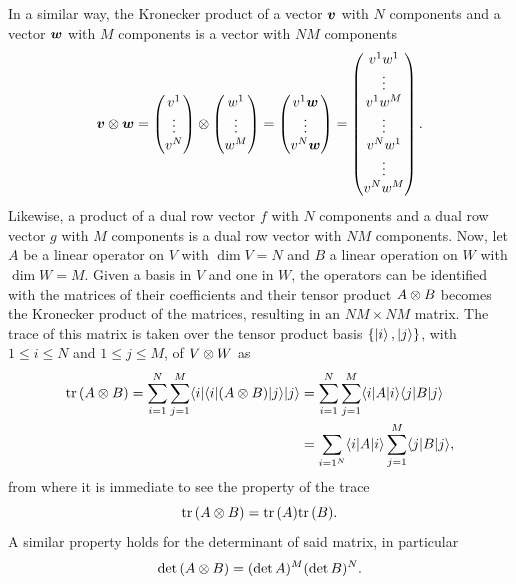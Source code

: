 In a similar way, the Kronecker product of a vector $\bm{v}$ with $N$ components and a vector $\bm{w}$ with $M$ components is a vector with $NM$ components
\begin{equation}
    \bm{v} \otimes \bm{w} = 
    \begin{pmatrix}
        v^1 \\
        \vdots \\
        v^N
    \end{pmatrix} \otimes 
    \begin{pmatrix}
        w^1 \\
        \vdots \\
        w^M
    \end{pmatrix} =
    \begin{pmatrix}
        v^1\bm{w} \\
        \vdots \\
        v^N\bm{w}
    \end{pmatrix} = 
    \begin{pmatrix}
        v^1w^1 \\
        \vdots \\
        v^1w^M \\
        \vdots \\
        v^Nw^1 \\
        \vdots \\
        v^Nw^M
    \end{pmatrix}.
\end{equation}
Likewise, a product of a dual row vector $f$ with $N$ components and a dual row vector $g$ with $M$ components is a dual row vector with $NM$ components. Now, let $A$ be a linear operator on $V$ with $\dim{V} = N$ and $B$ a linear operation on $W$ with $\dim{W} = M$. Given a basis in $V$ and one in $W$, the operators can be identified with the matrices of their coefficients and their tensor product $A \otimes B$ becomes the Kronecker product of the matrices, resulting in an $NM\times NM$ matrix. The trace of this matrix is taken over the tensor product basis $\{\ket{i},\ket{j}\}$, with $1 \le i \le N$ and $1 \le j \le M$, of $V \otimes W$ as
\begin{equation}
    \begin{split}
        \mathrm{tr}\,{(A \otimes B)} = \sum_{i=1}^N\sum_{j=1}^M\langle i | \langle i | (A \otimes B) | j \rangle | j \rangle &= \sum_{i=1}^N\sum_{j=1}^M\langle i | A | i \rangle\langle j | B | j \rangle \\
        &= \sum_{i=1^N}\langle i | A | i \rangle\sum_{j=1}^M\langle j | B | j \rangle,
    \end{split}
\end{equation}
from where it is immediate to see the property of the trace
\begin{equation}
    \mathrm{tr}\,{(A \otimes B)} = \mathrm{tr}\,{(A)}\mathrm{tr}\,{(B)}.
\end{equation}
A similar property holds for the determinant of said matrix, in particular
\begin{equation}
    \det{(A \otimes B)} = (\det{A})^M(\det{B})^N.
\end{equation}

